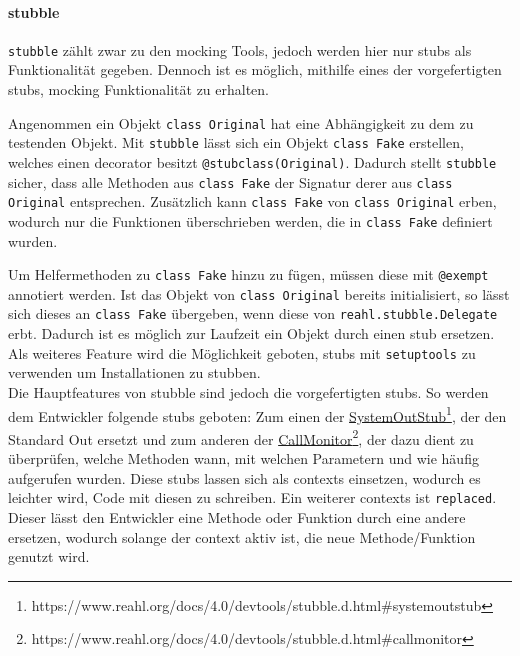 \paragraph{stubble}\label{python-tools:stubble}\mbox{}
\newline
\lstinline{stubble} zählt zwar zu den \gls{mock}ing Tools, jedoch werden hier
nur \Glspl{stub} als Funktionalität gegeben. Dennoch ist es möglich, mithilfe 
eines der vorgefertigten \Glspl{stub}, \gls{mock}ing Funktionalität zu erhalten.
\newline

Angenommen ein Objekt \lstinline{class Original} hat eine Abhängigkeit zu dem zu
testenden Objekt. Mit \lstinline{stubble} lässt sich ein Objekt
\lstinline{class Fake} erstellen, welches einen \gls{decorator} besitzt
\lstinline{@stubclass(Original)}. Dadurch stellt \lstinline{stubble} sicher,
dass alle Methoden aus \lstinline{class Fake} der Signatur derer aus
\lstinline{class Original} entsprechen. Zusätzlich kann \lstinline{class Fake}
von \lstinline{class Original} erben, wodurch nur die Funktionen überschrieben
werden, die in \lstinline{class Fake} definiert wurden.

Um Helfermethoden zu \lstinline{class Fake} hinzu zu fügen, müssen diese mit
\lstinline{@exempt} annotiert werden. Ist das Objekt von
\lstinline{class Original} bereits initialisiert, so lässt sich dieses an
\lstinline{class Fake} übergeben, wenn diese von 
\lstinline{reahl.stubble.Delegate} erbt. Dadurch ist es möglich zur Laufzeit
ein Objekt durch einen \Gls{stub} ersetzen. Als weiteres Feature wird die
Möglichkeit geboten, \Glspl{stub} mit \lstinline{setuptools} zu verwenden um
Installationen zu \gls{stub}ben.
\newline
\\
Die Hauptfeatures von stubble sind jedoch die vorgefertigten \Glspl{stub}. So
werden dem Entwickler folgende \Glspl{stub} geboten:
Zum einen der
\href{https://www.reahl.org/docs/4.0/devtools/stubble.d.html\#systemoutstub}{SystemOutStub}\footnote{https://www.reahl.org/docs/4.0/devtools/stubble.d.html\#systemoutstub},
der den Standard Out ersetzt und zum anderen der
\href{https://www.reahl.org/docs/4.0/devtools/stubble.d.html\#callmonitor}{CallMonitor}\footnote{https://www.reahl.org/docs/4.0/devtools/stubble.d.html\#callmonitor},
der dazu dient zu überprüfen, welche Methoden wann, mit welchen Parametern und
wie häufig aufgerufen wurden.
Diese \Glspl{stub} lassen sich als \Glspl{context} einsetzen, wodurch es
leichter wird, Code mit diesen zu schreiben. Ein weiterer \Glspl{context} ist
\lstinline{replaced}. Dieser lässt den Entwickler eine Methode oder Funktion
durch eine andere ersetzen, wodurch solange der \Gls{context} aktiv ist, die
neue Methode/Funktion genutzt wird.
\newline

